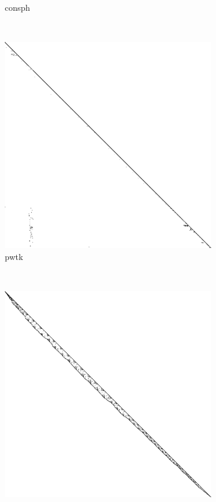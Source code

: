 \begin{figure}
\begin{multicols}{4}
\begin{subfigure}{\linewidth}
\caption{consph}
\end{subfigure}~%
\begin{subfigure}{\linewidth}
\includegraphics[width=\linewidth]{images/pwtk}
\caption{pwtk}
\end{subfigure}~%
\end{multicols}
\begin{multicols}{4}
\begin{subfigure}{\linewidth}
\includegraphics[width=\linewidth]{images/shipsec1}

\end{subfigure}
\end{multicols}
\end{figure}
